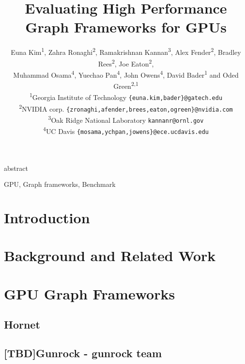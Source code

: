\documentclass[conference]{IEEEtran}
\newcommand*{\affaddr}[1]{#1} %
\newcommand*{\affmark}[1][*]{\textsuperscript{#1}}
\newcommand*{\email}[1]{\texttt{#1}}
\begin{document}
\title{Evaluating High Performance Graph Frameworks for GPUs} 

\author{%
Euna Kim\affmark[1], Zahra Ronaghi\affmark[2], Ramakrishnan Kannan\affmark[3], Alex Fender\affmark[2], Bradley Rees\affmark[2], Joe Eaton\affmark[2],\\ Muhammad Osama\affmark[4], Yuechao Pan\affmark[4], John Owens\affmark[4], David Bader\affmark[1] and Oded Green\affmark[2,1]\\
\affaddr{\affmark[1]Georgia Institute of Technology} \email{\{euna.kim,bader\}@gatech.edu}\\
\affaddr{\affmark[2]NVIDIA corp.} \email{\{zronaghi,afender,brees,eaton,ogreen\}@nvidia.com}\\
\affaddr{\affmark[3]Oak Ridge National Laboratory} \email{kannanr@ornl.gov}\\
\affaddr{\affmark[4]UC Davis} \email{\{mosama,ychpan,jowens\}@ece.ucdavis.edu}
}



\maketitle

 {abstract}
\begin{IEEEkeywords}
GPU, Graph frameworks, Benchmark
\end{IEEEkeywords}

\section{Introduction}
\label{sec:intro}


\section{Background and Related Work}
\label{sec:background-related}


\section{GPU Graph Frameworks} %
\label{sec:gpu-framework}

\subsection{Hornet}

\subsection{[TBD]Gunrock - gunrock team}

\end{document}
